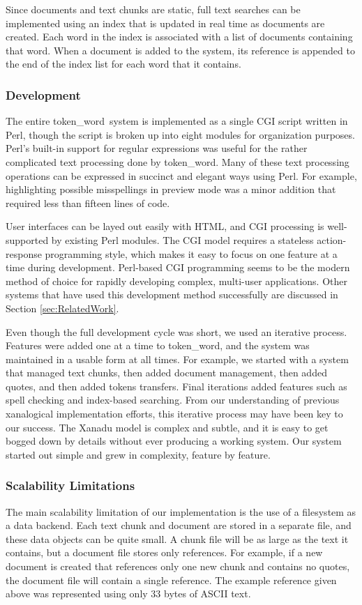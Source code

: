 \documentclass{acm_proc_article-sp}
\newcommand{\tw}{token\_word}
\begin{document}
Since documents and text chunks are static, full text searches can be implemented using an index that is updated in real time as documents are created.
Each word in the index is associated with a list of documents containing that word.
When a document is added to the system, its reference is appended to the end of the index list for each word that it contains.


\subsubsection{Development}
The entire \tw \   system is implemented as a single CGI script written in Perl, though the script is broken up into eight modules for organization purposes.
Perl's built-in support for regular expressions was useful for the rather complicated text processing done by \tw.
Many of these text processing operations can be expressed in succinct and elegant ways using Perl.
For example, highlighting possible misspellings in preview mode was a minor addition that required less than fifteen lines of code.

User interfaces can be layed out easily with HTML, and CGI processing is well-supported by existing Perl modules.
The CGI model requires a stateless action-response programming style, which makes it easy to focus on one feature at a time during development.
Perl-based CGI programming seems to be the modern method of choice for rapidly developing complex, multi-user applications.
Other systems that have used this development method successfully are discussed in Section \ref{sec:RelatedWork}.

Even though the full development cycle was short, we used an iterative process.
Features were added one at a time to \tw, and the system was maintained in a usable form at all times.
For example, we started with a system that managed text chunks, then added document management, then added quotes, and then added tokens transfers.
Final iterations added features such as spell checking and index-based searching.
From our understanding of previous xanalogical implementation efforts, this iterative process may have been key to our success.
The Xanadu model is complex and subtle, and it is easy to get bogged down by details without ever producing a working system.
Our system started out simple and grew in complexity, feature by feature.


\subsubsection{Scalability Limitations}
The main scalability limitation of our implementation is the use of a filesystem as a data backend.
Each text chunk and document are stored in a separate file, and these data objects can be quite small.
A chunk file will be as large as the text it contains, but a document file stores only references.
For example, if a new document is created that references only one new chunk and contains no quotes, the document file will contain a single reference.
The example reference given above was represented using only 33 bytes of ASCII text.
\end{document}
